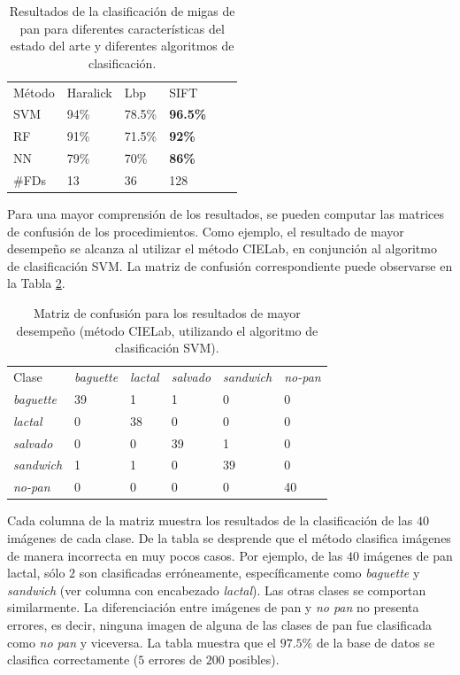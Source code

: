 \begin{table}[h!]
\center
\begin{tabular}{llllll}
\hline\noalign{\smallskip}
Método & Haralick & Lbp & SIFT\\ %
\noalign{\smallskip}\hline\noalign{\smallskip}
SVM & 94\% & 78.5\% & \textbf{96.5\%} \\ %
RF  & 91\% & 71.5\% & \textbf{92\%} \\ %
NN & 79\% & 70\% & \textbf{86\%} \\ %
\noalign{\smallskip}\hline
\#FDs & 13 & 36 & 128 \\
\hline
\end{tabular}
\caption{Resultados de la clasificación de migas de pan para diferentes características del estado del arte y diferentes algoritmos de clasificación.}
\label{tab:other}       %
\end{table}


Para una mayor comprensión de los resultados, se pueden computar las matrices de confusión de los procedimientos.
Como ejemplo, el resultado de mayor desempeño se alcanza al utilizar el método CIELab, en conjunción al algoritmo de clasificación SVM.
La matriz de confusión correspondiente puede observarse en la Tabla \ref{tab:confusionmatrix}.


\begin{table}[h!]
\center
\begin{tabular}{llllll}
\hline\noalign{\smallskip}
Clase&{\em baguette} & {\em lactal} & {\em salvado} &{\em sandwich}&{\em no-pan} \\
\noalign{\smallskip}\hline\noalign{\smallskip}
{\em baguette} & 39& 1 &1 &0 &0 \\
{\em lactal} & 0& 38 &0 &0 &0  \\
{\em salvado} & 0& 0 &39 &1 &0  \\
{\em sandwich} & 1& 1 &0 &39 &0  \\
{\em no-pan} & 0& 0 &0 &0 &40  \\
\hline
\end{tabular}
\caption{Matriz de confusión para los resultados de mayor desempeño (método CIELab, utilizando el algoritmo de clasificación SVM).}
\label{tab:confusionmatrix}       %
\end{table}

Cada columna de la matriz muestra los resultados de la clasificación de las $40$ imágenes de cada clase.
De la tabla se desprende que el método clasifica imágenes de manera incorrecta en muy pocos casos.
Por ejemplo, de las $40$ imágenes de pan lactal, sólo $2$ son clasificadas erróneamente, específicamente como {\em baguette} y {\em sandwich} (ver columna con encabezado {\em lactal}).
Las otras clases se comportan similarmente.
La diferenciación entre imágenes de pan y {\em no pan} no presenta errores, es decir, ninguna imagen de alguna de las clases de pan fue clasificada como {\em no pan} y viceversa.
La tabla muestra que el $97.5\%$ de la base de datos se clasifica correctamente ($5$ errores de $200$ posibles).

